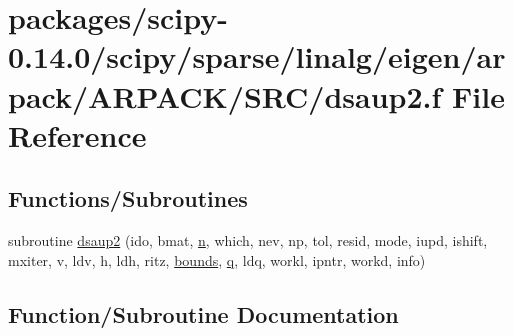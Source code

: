 \hypertarget{dsaup2_8f}{}\section{packages/scipy-\/0.14.0/scipy/sparse/linalg/eigen/arpack/\+A\+R\+P\+A\+C\+K/\+S\+R\+C/dsaup2.f File Reference}
\label{dsaup2_8f}
\subsection*{Functions/\+Subroutines}
\begin{DoxyCompactItemize}
\item 
subroutine \hyperlink{dsaup2_8f_a42162e365eabd8a231590dd504840af1}{dsaup2} (ido, bmat, \hyperlink{indexexpr_8h_ab427e2e2b4d6cec55fa088ea2a692ace}{n}, which, nev, np, tol, resid, mode, iupd, ishift, mxiter, v, ldv, h, ldh, ritz, \hyperlink{structbounds}{bounds}, \hyperlink{indexexpr_8h_ac886c3584e464b5533390d7440c9dd98}{q}, ldq, workl, ipntr, workd, info)
\end{DoxyCompactItemize}


\subsection{Function/\+Subroutine Documentation}
\hypertarget{dsaup2_8f_a42162e365eabd8a231590dd504840af1}{}
